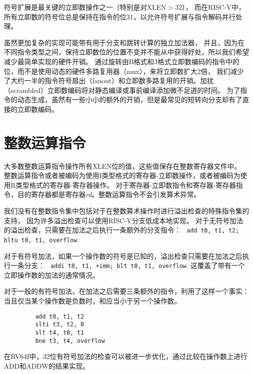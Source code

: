 \begin{commentary}
符号扩展是最关键的立即数操作之一（特别是对XLEN$>$32），
而在RISC-V中，所有立即数的符号位总是保持在指令的位31，以允许符号扩展与指令解码并行处理。

虽然更加复杂的实现可能带有用于分支和跳转计算的独立加法器，
并且，因为在不同指令类型之间，保持立即数位的位置不变并不能从中获得好处，所以我们希望减少最简单实现的硬件开销。
通过旋转由B格式和J格式立即数编码的指令中的位，而不是使用动态的硬件多路复用器（mux），来将立即数扩大2倍，
我们减少了大约一半的指令符号扇出（fanout）和立即数多路复用的开销。加扰（scrambled）立即数编码将对静态编译或事前编译添加微不足道的时间。
为了指令的动态生成，虽然有一些小小的额外的开销，但是最常见的短转向分支却有了直接的立即数编码。
\end{commentary}

\section{整数运算指令}

大多数整数运算指令操作所有XLEN位的值，这些值保存在整数寄存器文件中。
整数运算指令或者被编码为使用I类型格式的寄存器-立即数操作，或者被编码为使用R类型格式的寄存器-寄存器操作。
对于寄存器-立即数指令和寄存器-寄存器指令，目的寄存器都是寄存器{\em rd}。整数运算指令不会引发算术异常。

\begin{commentary}
我们没有在整数指令集中包括对于在整数算术操作时进行溢出检查的特殊指令集的支持，
因为许多溢出检查可以使用RISC-V分支低成本地实现。
对于无符号加法的溢出检查，只需要在加法之后执行一条额外的分支指令：
\verb! add t0, t1, t2; bltu t0, t1, overflow!.

对于有符号加法，如果一个操作数的符号是已知的，溢出检查只需要在加法之后执行一条分支：
\verb! addi t0, t1, +imm; blt t0, t1, overflow!.  
这覆盖了带有一个立即操作数的加法的通常情况。

对于一般的有符号加法，在加法之后需要三条额外的指令，利用了这样一个事实：当且仅当某个操作数是负数时，和应当小于另一个操作数。
\begin{verbatim}
         add t0, t1, t2
         slti t3, t2, 0
         slt t4, t0, t1
         bne t3, t4, overflow
\end{verbatim}
在RV64I中，32位有符号加法的检查可以被进一步优化，通过比较在操作数上进行ADD和ADDW的结果实现。
\end{commentary}

